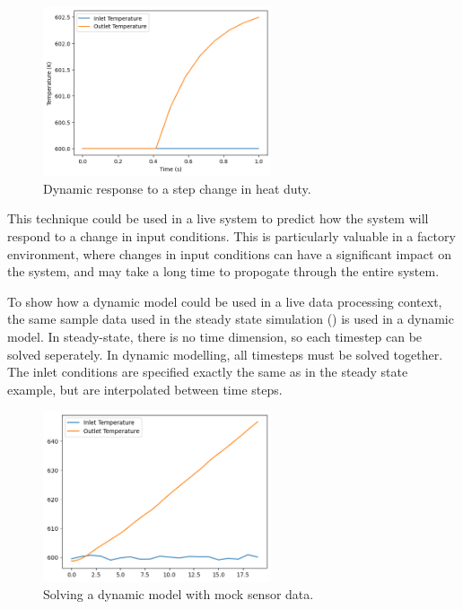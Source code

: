 \documentclass[12pt]{article}
\begin{document}
\begin{figure}[h]
    \centering
    \includegraphics[width=0.6\textwidth]{dynamic_test.png}
    \caption{Dynamic response to a step change in heat duty.}
    \label{fig:dynamic_test}
\end{figure}

This technique could be used in a live system to predict how the system will respond to a change in input conditions. This is particularly valuable in a factory environment, where changes in input conditions can have a significant impact on the system, and may take a long time to propogate through the entire system. 

To show how a dynamic model could be used in a live data processing context, the same sample data used in the steady state simulation () is used in a dynamic model. 
In steady-state, there is no time dimension, so each timestep can be solved seperately. 
In dynamic modelling, all timesteps must be solved together. 
The inlet conditions are specified exactly the same as in the steady state example, but are interpolated between time steps. 

\begin{figure}[h]
    \centering
    \includegraphics[width=0.6\textwidth]{dynamic_live.png}
    \caption{Solving a dynamic model with mock sensor data.}
    \label{fig:dynamic_live}
\end{figure}
\end{document}
